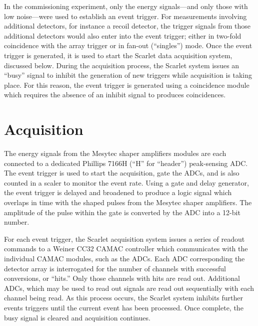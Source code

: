 In the commissioning experiment, only the energy signals---and only those with low noise---were used to establish an event trigger.  For measurements involving additional detectors, for instance a recoil detector, the trigger signals from those additional detectors would also enter into the event trigger; either in two-fold coincidence with the array trigger or in fan-out (``singles'') mode.  
Once the event trigger is generated, it is used to start the Scarlet data acquisition system, discussed below.  During the acquisition process, the Scarlet system issues an ``busy'' signal to inhibit the generation of new triggers while acquisition is taking place.  For this reason, the event trigger is generated using a coincidence module which requires the absence of an inhibit signal to produces coincidences.

\section{Acquisition}
\label{acq}
The energy signals from the Mesytec shaper amplifiers modules are each connected to a dedicated Phillips 7166H (``H'' for ``header'') peak-sensing ADC.  The event trigger is used to start the acquisition, gate the ADCs, and is also counted in a scaler to monitor the event rate.  Using a gate and delay generator, the event trigger is delayed and broadened to produce a logic signal which overlaps in time with the shaped pulses from the Mesytec shaper amplifiers.  The amplitude of the pulse within the gate is converted by the ADC into a 12-bit number.

For each event trigger, the Scarlet acquisition system issues a series of readout commands to a Weiner CC32 CAMAC controller which communicates with the individual CAMAC modules, such as the ADCs.  Each ADC corresponding the detector array is interrogated for the number of channels with successful conversions, or ``hits.'' Only those channels with hits are read out. Additional ADCs, which may be used to read out signals  are read out sequentially with each channel being read.  As this process occurs, the Scarlet system inhibits further events triggers until the current event has been processed.  Once complete, the busy signal is cleared and acquisition continues.